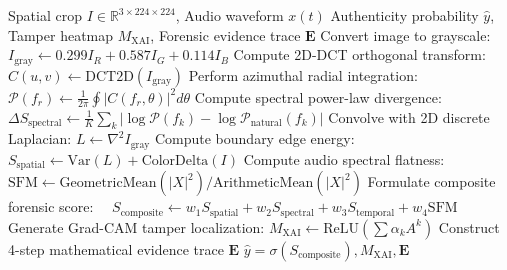 \documentclass[journal]{IEEEtran}
\begin{document}
\begin{algorithm}[!t]
\caption{FreqForensics-XAI Spectral Decomposition and Inference}
\label{alg:freq_infer}
\begin{algorithmic}[1]
\REQUIRE Spatial crop $I \in \mathbb{R}^{3 \times 224 \times 224}$, Audio waveform $x(t)$
\ENSURE Authenticity probability $\hat{y}$, Tamper heatmap $M_{\text{XAI}}$, Forensic evidence trace $\mathbf{E}$
\STATE Convert image to grayscale: $I_{\text{gray}} \leftarrow 0.299 I_R + 0.587 I_G + 0.114 I_B$
\STATE Compute 2D-DCT orthogonal transform: $C(u, v) \leftarrow \text{DCT2D}(I_{\text{gray}})$
\STATE Perform azimuthal radial integration: $\mathcal{P}(f_r) \leftarrow \frac{1}{2\pi} \oint |C(f_r, \theta)|^2 d\theta$
\STATE Compute spectral power-law divergence: $\Delta S_{\text{spectral}} \leftarrow \frac{1}{K} \sum_k |\log \mathcal{P}(f_k) - \log \mathcal{P}_{\text{natural}}(f_k)|$
\STATE Convolve with 2D discrete Laplacian: $L \leftarrow \nabla^2 I_{\text{gray}}$
\STATE Compute boundary edge energy: $S_{\text{spatial}} \leftarrow \text{Var}(L) + \text{ColorDelta}(I)$
\STATE Compute audio spectral flatness: $\text{SFM} \leftarrow \text{GeometricMean}(|X|^2) / \text{ArithmeticMean}(|X|^2)$
\STATE Formulate composite forensic score:
\STATE $\quad S_{\text{composite}} \leftarrow w_1 S_{\text{spatial}} + w_2 S_{\text{spectral}} + w_3 S_{\text{temporal}} + w_4 \text{SFM}$
\STATE Generate Grad-CAM tamper localization: $M_{\text{XAI}} \leftarrow \text{ReLU}(\sum \alpha_k A^k)$
\STATE Construct 4-step mathematical evidence trace $\mathbf{E}$
\RETURN $\hat{y} = \sigma(S_{\text{composite}}), M_{\text{XAI}}, \mathbf{E}$
\end{algorithmic}
\end{algorithm}
\end{document}
